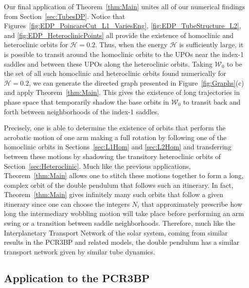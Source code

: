 \documentclass[11pt]{article}
\numberwithin{equation}{section}
\theoremstyle{plain}
\begin{document}
Our final application of Theorem~\ref{thm:Main} unites all of our numerical findings from Section~\ref{sec:TubesDP}. Notice that Figures~\ref{fig:EDP_PoincareCut_L1_VariesEng}, \ref{fig:EDP_TubeStructure_L2}, and \ref{fig:EDP_HeteroclinicPoints} all provide the existence of homoclinic and heteroclinic orbits for $\mathcal{H} = 0.2$. Thus, when the energy $\mathcal{H}$ is sufficiently large, it is possible to transit around the homoclinic orbits to the UPOs near the index-1 saddles and between these UPOs along the heteroclinic orbits. Taking $\mathcal{W}_0$ to be the set of all such homoclinic and heteroclinic orbits found numerically for $\mathcal{H} = 0.2$, we can generate the directed graph presented in Figure~\ref{fig:Graphs}(c) and apply Theorem~\ref{thm:Main}. This gives the existence of long trajectories in phase space that temporarily shadow the base orbits in $\mathcal{W}_0$ to transit back and forth between neighborhoods of the index-1 saddles. 

Precisely, one is able to determine the existence of orbits that perform the acrobatic motion of one arm making a full rotation by following one of the homoclinic orbits in Sections~\ref{sec:L1Hom} and \ref{sec:L2Hom} and transferring between these motions by shadowing the transitory heteroclinic orbits of Section~\ref{sec:Heteroclinic}. Much like the previous applications, Theorem~\ref{thm:Main} allows one to stitch these motions together to form a long, complex orbit of the double pendulum that follows such an itinerary. In fact, Theorem~\ref{thm:Main} gives infinitely many such orbits that follow a given itinerary since one can choose the integers $N_i$ that approximately prescribe how long the intermediary wobbling motion will take place before performing an arm swing or a transition between saddle neighborhoods. Therefore, much like the Interplanetary Transport Network of the solar system, coming from similar results in the PCR3BP and related models, the double pendulum has a similar transport network given by similar tube dynamics.    

\subsection{Application to the PCR3BP}\label{subsec:TBPapplication}
\end{document}
